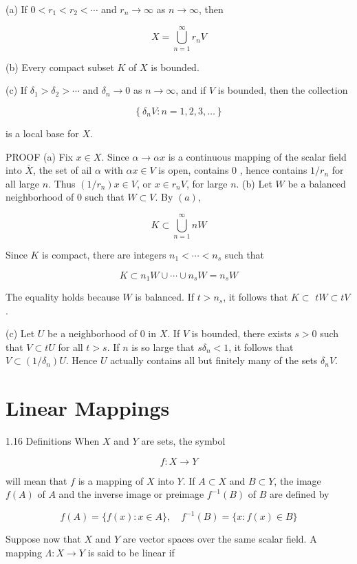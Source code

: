\documentclass[10pt]{article}
\begin{document}
(a) If $0<r_{1}<r_{2}<\cdots$ and $r_{n} \rightarrow \infty$ as $n \rightarrow \infty$, then

$$
X=\bigcup_{n=1}^{\infty} r_{n} V
$$

(b) Every compact subset $K$ of $X$ is bounded.

(c) If $\delta_{1}>\delta_{2}>\cdots$ and $\delta_{n} \rightarrow 0$ as $n \rightarrow \infty$, and if $V$ is bounded, then the collection

$$
\left\{\delta_{n} V: n=1,2,3, \ldots\right\}
$$

is a local base for $X$.

PROOF (a) Fix $x \in X$. Since $\alpha \rightarrow \alpha x$ is a continuous mapping of the scalar field into $\bar{X}$, the set of ail $\alpha$ with $\alpha x \in V$ is open, contains 0 , hence contains $1 / r_{n}$ for all large $n$. Thus $\left(1 / r_{n}\right) x \in V$, or $x \in r_{n} V$, for large $n$.
(b) Let $W$ be a balanced neighborhood of 0 such that $W \subset V$. By $(a)$,

$$
K \subset \bigcup_{n=1}^{\infty} n W
$$

Since $K$ is compact, there are integers $n_{1}<\cdots<n_{s}$ such that

$$
K \subset n_{1} W \cup \cdots \cup n_{s} W=n_{s} W
$$

The equality holds because $W$ is balanced. If $t>n_{s}$, it follows that $K \subset$ $t W \subset t V$.

(c) Let $U$ be a neighborhood of 0 in $X$. If $V$ is bounded, there exists $s>0$ such that $V \subset t U$ for all $t>s$. If $n$ is so large that $s \delta_{n}<1$, it follows that $V \subset\left(1 / \delta_{n}\right) U$. Hence $U$ actually contains all but finitely many of the sets $\delta_{n} V$.

\section{Linear Mappings}
1.16 Definitions When $X$ and $Y$ are sets, the symbol

$$
f: X \rightarrow Y
$$

will mean that $f$ is a mapping of $X$ into $Y$. If $A \subset X$ and $B \subset Y$, the image $f(A)$ of $A$ and the inverse image or preimage $f^{-1}(B)$ of $B$ are defined by

$$
f(A)=\{f(x): x \in A\}, \quad f^{-1}(B)=\{x: f(x) \in B\}
$$

Suppose now that $X$ and $Y$ are vector spaces over the same scalar field. A mapping $\Lambda: X \rightarrow Y$ is said to be linear if
\end{document}
